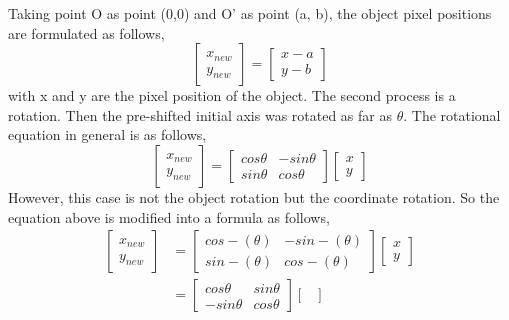 \documentclass[11pt]{article}
\begin{document}
\begin{linenumbers}
\begin{center}
\end{center}
Taking point O as point (0,0) and O' as point (a, b), the object pixel positions are formulated as follows,
\begin{equation}
	\begin{bmatrix}
		x_{new} \\
		y_{new}
	\end{bmatrix} = \begin{bmatrix}
	x - a \\
	y - b 
\end{bmatrix}
\end{equation}
with x and y are the pixel position of the object.
The second process is a rotation. Then the pre-shifted initial axis was rotated as far as \(\theta\). The rotational equation in general is as follows,
\begin{equation}
	\begin{bmatrix}
		x_{new} \\
		y_{new}
	\end{bmatrix} = \begin{bmatrix}
	cos \theta & -sin \theta \\
	sin \theta & cos \theta
\end{bmatrix} 
\begin{bmatrix}
	x\\y
\end{bmatrix}
\end{equation}
However, this case is not the object rotation but the coordinate rotation. So the equation above is modified into a formula as follows,
\begin{equation}
	\begin{split}
		\begin{bmatrix}
			x_{new} \\
			y_{new}
		\end{bmatrix} &= \begin{bmatrix}
		cos -(\theta) & -sin -(\theta) \\
		sin -(\theta) & cos -(\theta)
	\end{bmatrix} 
	\begin{bmatrix}
		x\\y
	\end{bmatrix} 
	\\
	&= \begin{bmatrix}
		cos \theta  & sin \theta \\
		-sin \theta & cos \theta
	\end{bmatrix} 
	\begin{bmatrix}

\end{bmatrix}
\end{split}
\end{equation}
\end{linenumbers}
\end{document}

